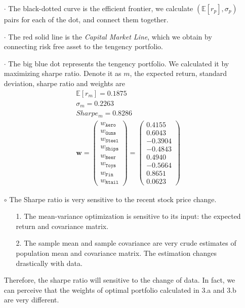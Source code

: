 \documentclass[10 pt]{hwtemplate} %
\begin{document}
\begin{itemize}
  \item[$\cdot$] The black-dotted curve is the efficient frontier, we calculate $(\mathbb{E}\left[r_p\right], \sigma_p)$ pairs for each of the dot, and connect them together.
  \item[$\cdot$] The red solid line is the \textit{Capital Market Line}, which we obtain by connecting risk free asset to the tengency portfolio.
  \item[$\cdot$] The big blue dot represents the tengency portfolio. We calculated it by maximizing sharpe ratio. Denote it as $m$, the expected return, standard deviation, sharpe ratio and weights are
  \begin{equation}
    \begin{split}
      &\mathbb{E}\left[r_m\right] = 0.1875\\
      &\sigma_m = 0.2263\\
      &Sharpe_m = 0.8286 \\
      &\bm{w} = \begin{pmatrix}
        w_{\mathtt{Aero}}\\
        w_{\mathtt{Guns}}\\
        w_{\mathtt{Steel}}\\
        w_{\mathtt{Ships}}\\
        w_{\mathtt{Beer}}\\
        w_{\mathtt{Toys}}\\
        w_{\mathtt{Fin}}\\
        w_{\mathtt{Rtail}}
      \end{pmatrix}=
      \begin{pmatrix}
        0.4155\\
        0.6043\\
        -0.3904\\
        -0.4843\\
        0.4940\\
        -0.5664\\
        0.8651\\
        0.0623
      \end{pmatrix}
    \end{split}
  \end{equation}
\end{itemize}
\begin{itemize}
  \item[$\circ$] The Sharpe ratio is very sensitive to the recent stock price change.
  \begin{itemize}
    \item[1.] The mean-variance optimization is sensitive to its input: the expected return and covariance matrix.
    \item[2.] The sample mean and sample covariance are very crude estimates of population mean and covariance matrix. The estimation changes drastically with data.
  \end{itemize}
  Therefore, the sharpe ratio will sensitive to the change of data. In fact, we can perceive that the weights of optimal portfolio calculated in 3.a and 3.b are very different. 
\end{itemize}
\end{document}
